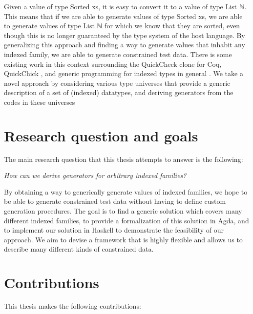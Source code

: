 \documentclass[a4paper,msc,twosized=semi]{uustthesis}
\let\oldemph\emph
\renewcommand\emph[1]{{\large\oldemph{#1}}}
\newcommand{\agda}[1]{{\agdafontinline\color{agdacolor}#1}}
\newcommand{\includeagda}[2]{\vspace*{-0.25cm}\begin{center}{\fontsize{12}{14}\agdafont\ExecuteMetaData[../src/chap0#1/latex/code.tex]{#2}}\end{center}\vspace*{-0.25cm}}
\begin{document}
\includeagda{2}{sorted}

  Given a value of type \agda{Sorted xs}, it is easy to convert it to a value of type \agda{List 
  ℕ}. This means that if we are able to generate values of type \agda{Sorted xs}, we are 
  able to generate values of type \agda{List ℕ} for which we know that they are sorted, 
  even though this is no longer guaranteed by the type system of the host language. By 
  generalizing this approach and finding a way to generate values that inhabit any 
  indexed family, we are able to generate constrained test data. There is some 
  existing work in this context surrounding the QuickCheck clone for Coq, QuickChick 
  \cite{denes2014quickchick}, and generic programming for indexed types in general \cite{magalhaes2011generic}. 
  We take a novel approach by considering various type universes that provide a 
  generic description of a set of (indexed) datatypes, and deriving generators from 
  the codes in these universes

\section{Research question and goals}

  The main research question that this thesis attempts to answer is the following: 
  \begin{center}
  \emph{
    How can we derive generators for arbitrary indexed families?
  } \end{center}
  By obtaining a way to generically generate values of indexed families, we hope to be 
  able to generate constrained test data without having to define custom generation 
  procedures. The goal is to find a generic solution which covers many different 
  indexed families, to provide a formalization of this solution in Agda, and to 
  implement our solution in Haskell to demonstrate the feasibility of our approach. We 
  aim to devise a framework that is highly flexible and allows us to describe many 
  different kinds of constrained data. 

\section{Contributions}

  This thesis makes the following contributions: 
\end{document}
